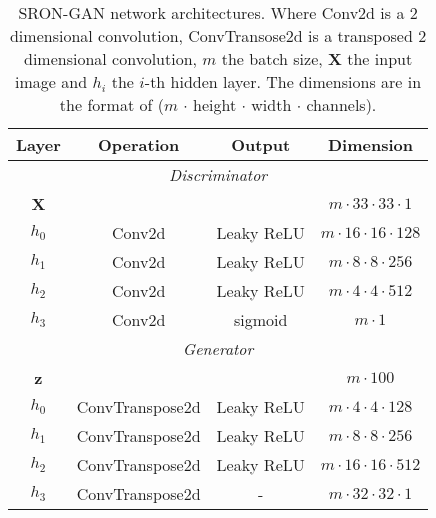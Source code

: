 \begin{table}[!htb]
\centering
\caption{SRON-GAN network architectures. Where Conv2d is a 2 dimensional convolution, ConvTransose2d is a transposed 2 dimensional convolution, $m$ the batch size, $\boldsymbol{X}$ the input image and $h_i$ the $i$-th hidden layer. The dimensions are in the format of ($m$ $\cdot$ height $\cdot$ width $\cdot$ channels).}
\label{table:srongan_architecture}
\begin{tabular}{|c|c|c|c|}
\hline
\textbf{Layer} & \textbf{Operation} & \textbf{Output} & \textbf{Dimension}         \\ \hline
\multicolumn{4}{|c|}{\textit{Discriminator}}                                       \\ \hline
\textbf{X}     &                    &                 & $m \cdot 33 \cdot 33 \cdot 1$   \\ \hline
$h_0$           & Conv2d             & Leaky ReLU      & $m \cdot 16 \cdot 16 \cdot 128$ \\ \hline
$h_1$           & Conv2d             & Leaky ReLU      & $m \cdot 8 \cdot 8 \cdot 256$   \\ \hline
$h_2$           & Conv2d             & Leaky ReLU      & $m \cdot 4 \cdot 4 \cdot 512$   \\ \hline
$h_3$           & Conv2d             & sigmoid         & $m \cdot 1$                   \\ \hline
\multicolumn{4}{|c|}{\textit{Generator}}                                           \\ \hline
\textbf{z}     &                    &                 & $m \cdot 100$                 \\ \hline
$h_0$           & ConvTranspose2d    & Leaky ReLU      & $m \cdot 4 \cdot 4 \cdot 128$   \\ \hline
$h_1$           & ConvTranspose2d    & Leaky ReLU      & $m \cdot 8 \cdot 8 \cdot 256$   \\ \hline
$h_2$           & ConvTranspose2d    & Leaky ReLU      & $m \cdot 16 \cdot 16 \cdot 512$ \\ \hline
$h_3$           & ConvTranspose2d    & -               & $m \cdot 32 \cdot 32 \cdot 1$   \\ \hline
\end{tabular}
\end{table}





